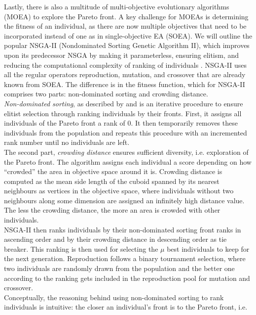 \documentclass[twoside,11pt]{article}
\begin{document}
Lastly, there is also a multitude of multi-objective evolutionary algorithms (MOEA) to explore the Pareto front.
A key challenge for MOEAs is determining the fitness of an individual, as there are now multiple objectives that need to be incorporated instead of
one as in single-objective EA (SOEA).
We will outline the popular NSGA-II (Nondominated Sorting Genetic Algorithm II), which improves upon its predecessor NSGA \citep{NSGA} by making it
parameterless, ensuring elitism, and reducing the computational complexity of ranking of individuals \citep[p. 182]{NSGA_II}.
NSGA-II uses all the regular operators reproduction, mutation, and crossover that are already known from SOEA.
The difference is in the fitness function, which for NSGA-II comprises two parts: non-dominated sorting and crowding distance.
\\
\textit{Non-dominated sorting}, as described by \citet[p. 201]{genetic_algos} and \citet[pp. 183f]{NSGA_II} is an iterative procedure to ensure
elitist selection through ranking individuals by their fronts.
First, it assigns all individuals of the Pareto front a rank of 0. It then temporarily removes these individuals from the population and repeats
this procedure with an incremented rank number until no individuals are left.
\\
The second part, \textit{crowding distance} ensures sufficient diversity, i.e. exploration of the Pareto front.
The algorithm assigns each individual a score depending on how ``crowded'' the area in objective space around it is. Crowding distance is computed
as the mean side length of the cuboid spanned by its nearest neighbours as vertices in the objective space, where individuals without two neighbours
along some dimension are assigned an infinitely high distance value. The less the crowding distance, the more an area is crowded with other individuals. \citep[p. 185]{NSGA_II}
\\
NSGA-II then ranks individuals by their non-dominated sorting front ranks in ascending order and by their crowding distance in descending order as tie breaker.
This ranking is then used for selecting the $\mu$ best individuals to keep for the next generation.
Reproduction follows a binary tournament selection, where two individuals are randomly drawn from the population and the better one according to the ranking gets
included in the reproduction pool for mutation and crossover.
\\
Conceptually, the reasoning behind using non-dominated sorting to rank individuals is intuitive: the closer an individual's front is to the Pareto front, i.e.
\end{document}

